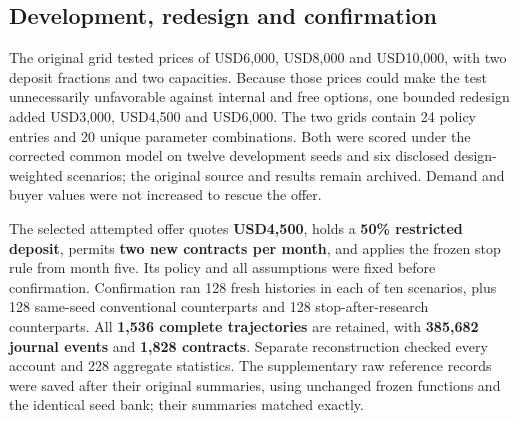 \documentclass[
  11pt,
]{article}
\begin{document}
\hypertarget{development-redesign-and-confirmation}{%
\subsection{Development, redesign and
confirmation}\label{development-redesign-and-confirmation}}

The original grid tested prices of USD6,000, USD8,000 and USD10,000,
with two deposit fractions and two capacities. Because those prices
could make the test unnecessarily unfavorable against internal and free
options, one bounded redesign added USD3,000, USD4,500 and USD6,000. The
two grids contain 24 policy entries and 20 unique parameter
combinations. Both were scored under the corrected common model on
twelve development seeds and six disclosed design-weighted scenarios;
the original source and results remain archived. Demand and buyer values
were not increased to rescue the offer.

The selected attempted offer quotes \textbf{USD4,500}, holds a
\textbf{50\% restricted deposit}, permits \textbf{two new contracts per
month}, and applies the frozen stop rule from month five. Its policy and
all assumptions were fixed before confirmation. Confirmation ran 128
fresh histories in each of ten scenarios, plus 128 same-seed
conventional counterparts and 128 stop-after-research counterparts. All
\textbf{1,536 complete trajectories} are retained, with \textbf{385,682
journal events} and \textbf{1,828 contracts}. Separate reconstruction
checked every account and 228 aggregate statistics. The supplementary
raw reference records were saved after their original summaries, using
unchanged frozen functions and the identical seed bank; their summaries
matched exactly.
\end{document}
